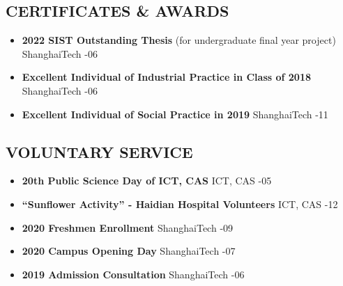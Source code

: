 \documentclass[a4paper,10pt]{ctexart} %
\begin{document}

\begin{keepsection}

\section{CERTIFICATES \& AWARDS}
\begin{itemize}
    \item \textbf{2022 SIST Outstanding Thesis} {\small (for undergraduate final year project)} \hfill ShanghaiTech -06
    \item \textbf{Excellent Individual of Industrial Practice in Class of 2018} \hfill ShanghaiTech -06
    \item \textbf{Excellent Individual of Social Practice in 2019} \hfill ShanghaiTech -11
\end{itemize}

\end{keepsection}



\begin{keepsection}

\section{VOLUNTARY SERVICE}
\begin{itemize}
    \item \textbf{20th Public Science Day of ICT, CAS}  \hfill ICT, CAS -05
    \item \textbf{``Sunflower Activity'' - Haidian Hospital Volunteers}  \hfill ICT, CAS -12
    \item \textbf{2020 Freshmen Enrollment}  \hfill ShanghaiTech -09
    \item \textbf{2020 Campus Opening Day}  \hfill ShanghaiTech -07
    \item \textbf{2019 Admission Consultation}  \hfill ShanghaiTech -06
\end{itemize}

\end{keepsection}
\end{document}
